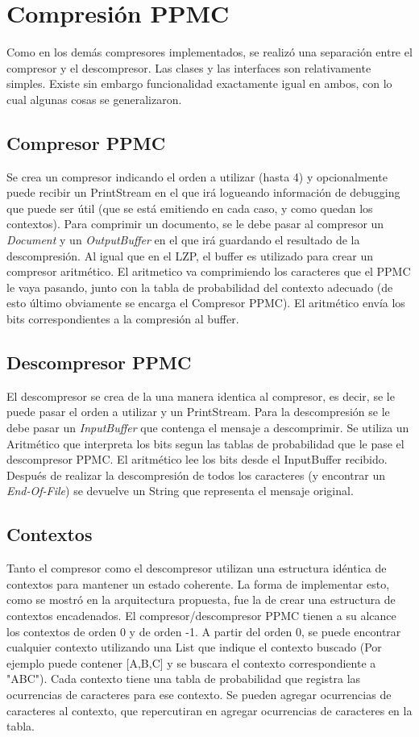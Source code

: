 \section{Compresión PPMC}

Como en los demás compresores implementados, se realizó una separación entre el compresor y el descompresor. 
Las clases y las interfaces son relativamente simples. Existe sin embargo funcionalidad exactamente igual en ambos, 
con lo cual algunas cosas se generalizaron.

\subsection{Compresor PPMC}
Se crea un compresor indicando el orden a utilizar (hasta 4) y opcionalmente puede recibir un PrintStream en el que irá
logueando información de debugging que puede ser útil (que se está emitiendo en cada caso, y como quedan los contextos).
Para comprimir un documento, se le debe pasar al compresor un \textit{Document} y un \textit{OutputBuffer} en el que irá
guardando el resultado de la descompresión. 
Al igual que en el LZP, el buffer es utilizado para crear un compresor aritmético. El aritmetico va comprimiendo los
caracteres que el PPMC le vaya pasando, junto con la tabla de probabilidad del contexto adecuado (de esto último 
obviamente se encarga el Compresor PPMC). El aritmético envía los bits correspondientes a la compresión al buffer.

\subsection{Descompresor PPMC}
El descompresor se crea de la una manera identica al compresor, es decir, se le puede pasar el orden a utilizar y un
PrintStream.
Para la descompresión se le debe pasar un \textit{InputBuffer} que contenga el mensaje a descomprimir. Se utiliza un
Aritmético que interpreta los bits segun las tablas de probabilidad que le pase el descompresor PPMC. El aritmético lee
los bits desde el InputBuffer recibido.
Después de realizar la descompresión de todos los caracteres (y encontrar un \textit{End-Of-File}) se devuelve un String
que representa el mensaje original.

\subsection{Contextos}
Tanto el compresor como el descompresor utilizan una estructura idéntica de contextos para mantener un estado coherente.
La forma de implementar esto, como se mostró en la arquitectura propuesta, fue la de crear una estructura de contextos 
encadenados.
El compresor/descompresor PPMC tienen a su alcance los contextos de orden 0 y de orden -1. A partir del orden 0, se 
puede encontrar cualquier contexto utilizando una List que indique el contexto buscado (Por ejemplo puede contener 
[A,B,C] y se buscara el contexto correspondiente a "ABC").
Cada contexto tiene una tabla de probabilidad que registra las ocurrencias de caracteres para ese contexto. Se pueden
agregar ocurrencias de caracteres al contexto, que repercutiran en agregar ocurrencias de caracteres en la tabla.

